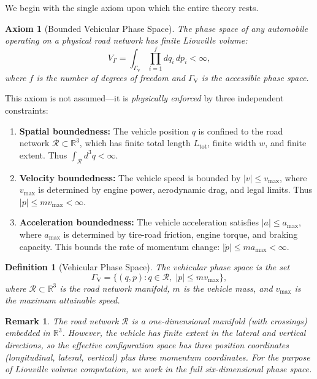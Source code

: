 \documentclass[twocolumn,10pt]{article}
\newtheorem{definition}[theorem]{Definition}
\newtheorem{axiom}[theorem]{Axiom}
\newtheorem{remark}[theorem]{Remark}
\newcommand{\GammaV}{\Gamma_{\mathrm{V}}}
\newcommand{\VGamma}{V_{\Gamma}}
\newcommand{\vmax}{v_{\mathrm{max}}}
\newcommand{\amax}{a_{\mathrm{max}}}
\begin{document}
We begin with the single axiom upon which the entire theory rests.

\begin{axiom}[Bounded Vehicular Phase Space]\label{ax:bounded}
The phase space of any automobile operating on a physical road network has finite Liouville volume:
\begin{equation}
\VGamma = \int_{\GammaV} \prod_{i=1}^{f} dq_i\, dp_i < \infty,
\end{equation}
where $f$ is the number of degrees of freedom and $\GammaV$ is the accessible phase space.
\end{axiom}

This axiom is not assumed---it is \emph{physically enforced} by three independent constraints:
\begin{enumerate}
    \item \textbf{Spatial boundedness:} The vehicle position $q$ is confined to the road network $\mathcal{R} \subset \mathbb{R}^3$, which has finite total length $L_{\mathrm{tot}}$, finite width $w$, and finite extent. Thus $\int_{\mathcal{R}} d^3q < \infty$.
    \item \textbf{Velocity boundedness:} The vehicle speed is bounded by $|v| \leq \vmax$, where $\vmax$ is determined by engine power, aerodynamic drag, and legal limits. Thus $|p| \leq m\vmax < \infty$.
    \item \textbf{Acceleration boundedness:} The vehicle acceleration satisfies $|a| \leq \amax$, where $\amax$ is determined by tire-road friction, engine torque, and braking capacity. This bounds the rate of momentum change: $|\dot{p}| \leq m\amax < \infty$.
\end{enumerate}

\begin{definition}[Vehicular Phase Space]\label{def:phasespace}
The vehicular phase space is the set
\begin{equation}
\GammaV = \bigl\{(q, p) : q \in \mathcal{R},\; |p| \leq m\vmax \bigr\},
\end{equation}
where $\mathcal{R} \subset \mathbb{R}^3$ is the road network manifold, $m$ is the vehicle mass, and $\vmax$ is the maximum attainable speed.
\end{definition}

\begin{remark}
The road network $\mathcal{R}$ is a one-dimensional manifold (with crossings) embedded in $\mathbb{R}^3$. However, the vehicle has finite extent in the lateral and vertical directions, so the effective configuration space has three position coordinates (longitudinal, lateral, vertical) plus three momentum coordinates. For the purpose of Liouville volume computation, we work in the full six-dimensional phase space.
\end{remark}
\end{document}

